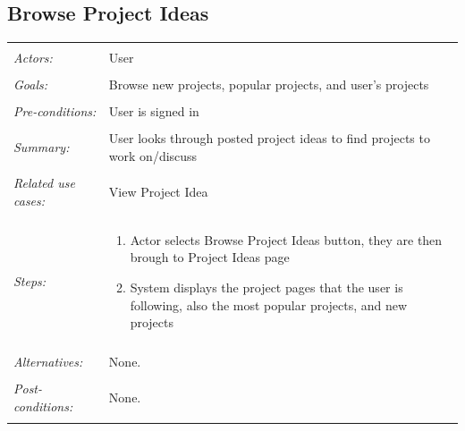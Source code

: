 \documentclass[11pt]{report}
\begin{document}
\subsection{Browse Project Ideas }
\begin{tabular}{ p{2cm} p{12cm} }
 \hline
 \\
 \textit{Actors:} & User \\ 
 \\
 \textit{Goals:} & Browse new projects, popular projects, and user's projects\\
 \\
 \textit{Pre-conditions:} & User is signed in  \\
 \\
 \textit{Summary:} & User looks through posted project ideas to find projects to work on/discuss \\ 
 \\
 \textit{Related use cases:} & View Project Idea  \\ 
 \\
 \textit{Steps:} & \begin{enumerate}
  \item Actor selects Browse Project Ideas button, they are then brough to Project Ideas page
  \item System displays the project pages that the user is following, also the most popular projects, and new projects
 \end{enumerate} \\
 \\
 \textit{Alternatives:} & None. \\
 \\
 \textit{Post-conditions:} & None. \\
 \\
\hline
\end{tabular}
\end{document}
